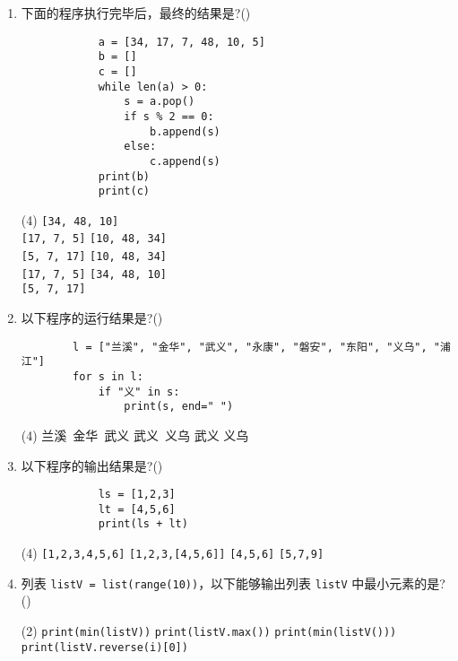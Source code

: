 \documentclass[11pt]{ctexart}
\begin{document}
    \begin{enumerate}
        \item 下面的程序执行完毕后，最终的结果是?(\qquad)
        \begin{lstlisting}
            a = [34, 17, 7, 48, 10, 5]
            b = []
            c = []
            while len(a) > 0:
                s = a.pop()
                if s % 2 == 0:
                    b.append(s)
                else:
                    c.append(s)
            print(b)
            print(c)
        \end{lstlisting}
        \begin{tasks}(4)
            \task \lstinline{[34, 48, 10]}\\
            \lstinline{[17, 7, 5]}
            \task \lstinline{[10, 48, 34]}\\
            \lstinline{[5, 7, 17]}
            \task \lstinline{[10, 48, 34]}\\
            \lstinline{[17, 7, 5]}
            \task \lstinline{[34, 48, 10]}\\
            \lstinline{[5, 7, 17]}
        \end{tasks}

        \item 以下程序的运行结果是?(\qquad)
        \begin{lstlisting}
        l = ["兰溪", "金华", "武义", "永康", "磐安", "东阳", "义乌", "浦江"]
        for s in l:
            if "义" in s:
                print(s, end=" ")
        \end{lstlisting}
        \begin{tasks}(4)
            \task 兰溪\ 金华\ 武义
            \task 武义\ 义乌
            \task 武义
            \task 义乌
        \end{tasks}

        \item 以下程序的输出结果是?(\qquad)
        \begin{lstlisting}
            ls = [1,2,3]
            lt = [4,5,6]
            print(ls + lt)
        \end{lstlisting}
        \begin{tasks}(4)
            \task \lstinline{[1,2,3,4,5,6]}
            \task \lstinline{[1,2,3,[4,5,6]]}
            \task \lstinline{[4,5,6]}
            \task \lstinline{[5,7,9]}
        \end{tasks}

        \item 列表 \lstinline{listV = list(range(10))}，以下能够输出列表 \lstinline{listV} 中最小元素的是?(\qquad)
        \begin{tasks}(2)
            \task \lstinline{print(min(listV))}
            \task \lstinline{print(listV.max())}
            \task \lstinline{print(min(listV()))}
            \task \lstinline{print(listV.reverse(i)[0])}
        \end{tasks}


\end{enumerate}
\end{document}

